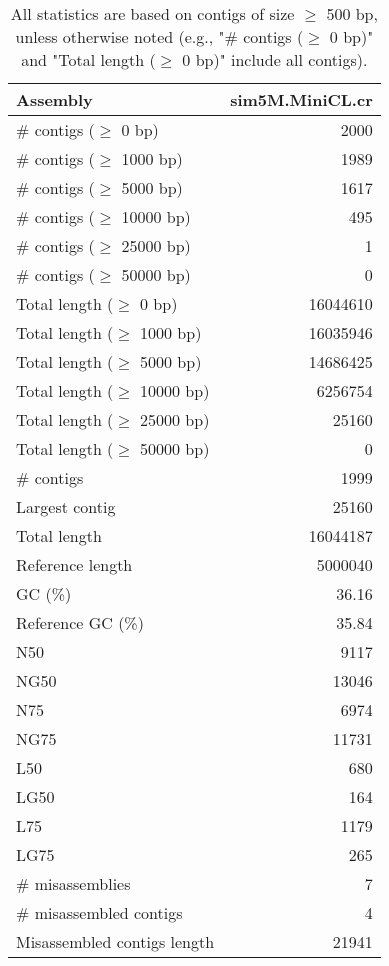 \documentclass[12pt,a4paper]{article}
\begin{document}
\begin{table}[ht]
\begin{center}
\caption{All statistics are based on contigs of size $\geq$ 500 bp, unless otherwise noted (e.g., "\# contigs ($\geq$ 0 bp)" and "Total length ($\geq$ 0 bp)" include all contigs).}
\begin{tabular}{|l*{1}{|r}|}
\hline
Assembly & sim5M.MiniCL.cr \\ \hline
\# contigs ($\geq$ 0 bp) & 2000 \\ \hline
\# contigs ($\geq$ 1000 bp) & 1989 \\ \hline
\# contigs ($\geq$ 5000 bp) & 1617 \\ \hline
\# contigs ($\geq$ 10000 bp) & 495 \\ \hline
\# contigs ($\geq$ 25000 bp) & 1 \\ \hline
\# contigs ($\geq$ 50000 bp) & 0 \\ \hline
Total length ($\geq$ 0 bp) & 16044610 \\ \hline
Total length ($\geq$ 1000 bp) & 16035946 \\ \hline
Total length ($\geq$ 5000 bp) & 14686425 \\ \hline
Total length ($\geq$ 10000 bp) & 6256754 \\ \hline
Total length ($\geq$ 25000 bp) & 25160 \\ \hline
Total length ($\geq$ 50000 bp) & 0 \\ \hline
\# contigs & 1999 \\ \hline
Largest contig & 25160 \\ \hline
Total length & 16044187 \\ \hline
Reference length & 5000040 \\ \hline
GC (\%) & 36.16 \\ \hline
Reference GC (\%) & 35.84 \\ \hline
N50 & 9117 \\ \hline
NG50 & 13046 \\ \hline
N75 & 6974 \\ \hline
NG75 & 11731 \\ \hline
L50 & 680 \\ \hline
LG50 & 164 \\ \hline
L75 & 1179 \\ \hline
LG75 & 265 \\ \hline
\# misassemblies & 7 \\ \hline
\# misassembled contigs & 4 \\ \hline
Misassembled contigs length & 21941 \\ \hline

\end{tabular}
\end{center}
\end{table}
\end{document}
